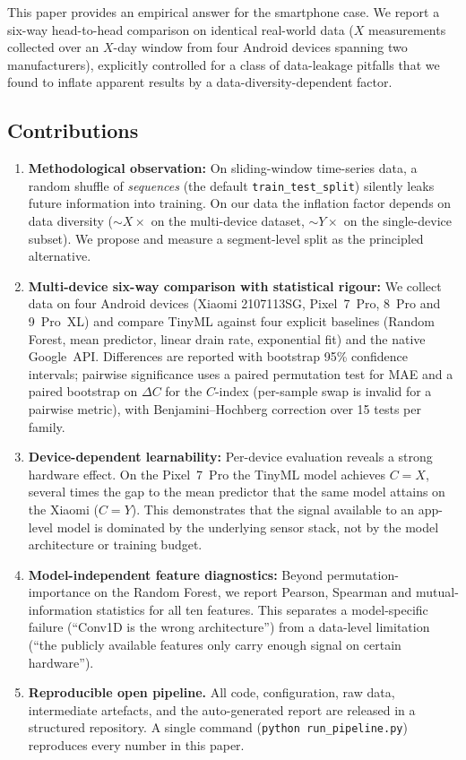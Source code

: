 \documentclass[conference]{IEEEtran}
\begin{document}
This paper provides an empirical answer for the smartphone case. We
report a six-way head-to-head comparison on identical real-world data
($X$ measurements collected over an $X$-day window from four Android
devices spanning two manufacturers), explicitly controlled for a class
of data-leakage pitfalls that we found to inflate apparent results by a
data-diversity-dependent factor.

\subsection*{Contributions}
\begin{enumerate}
\item \textbf{Methodological observation:} On sliding-window time-series
data, a random shuffle of \emph{sequences} (the default
\texttt{train\_test\_split}) silently leaks future information into
training. On our data the inflation factor depends on data
diversity ($\sim$$X\times$ on the multi-device dataset,
$\sim$$Y\times$ on the single-device subset).
We propose and measure a segment-level split as the principled
alternative.

\item \textbf{Multi-device six-way comparison with statistical rigour:}
We collect data on four Android devices (Xiaomi 2107113SG, Pixel~7~Pro,
8~Pro and 9~Pro~XL) and compare TinyML against four explicit baselines
(Random Forest, mean predictor, linear drain rate, exponential fit) and
the native Google~API. Differences are reported with bootstrap 95\%
confidence intervals; pairwise significance uses a paired permutation
test for MAE and a paired bootstrap on $\Delta C$ for the $C$-index
(per-sample swap is invalid for a pairwise metric), with
Benjamini--Hochberg correction over 15 tests per family.

\item \textbf{Device-dependent learnability:} Per-device evaluation
reveals a strong hardware effect. On the Pixel~7~Pro the TinyML model
achieves $C{=}X$, several times the gap to the mean predictor that the
same model attains on the Xiaomi ($C{=}Y$). This demonstrates that the
signal available to an app-level model is dominated by the underlying
sensor stack, not by the model architecture or training budget.

\item \textbf{Model-independent feature diagnostics:} Beyond
permutation-importance on the Random Forest, we report Pearson, Spearman
and mutual-information statistics for all ten features. This separates a
model-specific failure (``Conv1D is the wrong architecture'') from a
data-level limitation (``the publicly available features only carry
enough signal on certain hardware'').

\item \textbf{Reproducible open pipeline.} All code, configuration, raw
data, intermediate artefacts, and the auto-generated report are released
in a structured repository. A single command
(\texttt{python run\_pipeline.py}) reproduces every number in this paper.
\end{enumerate}



\end{document}
